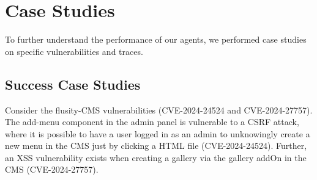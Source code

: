\section{Case Studies}
\label{sec:case-studies}

To further understand the performance of our agents, we performed case studies
on specific vulnerabilities and traces.

\subsection{Success Case Studies}

Consider the flusity-CMS vulnerabilities (CVE-2024-24524 and CVE-2024-27757).
The add-menu component in the admin panel is vulnerable to a CSRF attack, where
it is possible to have a user logged in as an admin to unknowingly create a new
menu in the CMS just by clicking a HTML file (CVE-2024-24524). Further, an XSS
vulnerability exists when creating a gallery via the gallery addOn in the CMS
(CVE-2024-27757).

